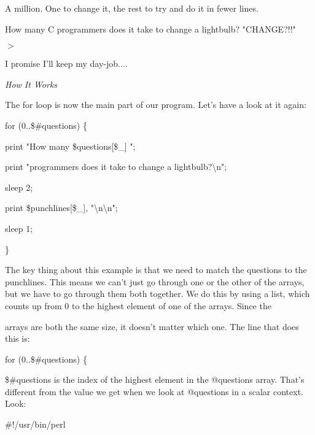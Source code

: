 \documentclass[a4paper,11pt]{book}
\begin{document}
\noindent A million. One to change it, the rest to try and do it in fewer lines.

\noindent 

\noindent How many C programmers does it take to change a lightbulb? "CHANGE?!!"

\noindent 

\noindent $>$

\noindent 

\noindent I promise I'll keep my day-job....

\noindent 

\noindent \textit{How It Works}

\noindent The for loop is now the main part of our program. Let's have a look at it again:

\noindent 

\noindent 

\noindent for (0..\$\#questions) \{

\noindent print "How many \$questions[\$\_] ";

\noindent print "programmers does it take to change a lightbulb?\textbackslash n";

\noindent sleep 2;

\noindent print \$punchlines[\$\_], "\textbackslash n\textbackslash n";

\noindent sleep 1;

\noindent \}

\noindent 

\noindent The key thing about this example is that we need to match the questions to the punchlines. This means we can't just go through one or the other of the arrays, but we have to go through them both together. We do this by using a list, which counts up from 0 to the highest element of one of the arrays. Since the

\noindent arrays are both the same size, it doesn't matter which one. The line that does this is:

\noindent 

\noindent 

\noindent for (0..\$\#questions) \{

\noindent 

\noindent \$\#questions is the index of the highest element in the @questions array. That's different from the value we get when we look at @questions in a scalar context. Look:

\noindent 

\noindent 

\noindent \#!/usr/bin/perl
\end{document}
